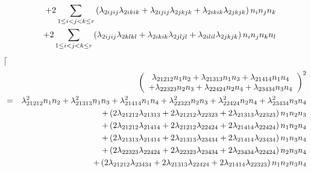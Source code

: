 \documentclass[12pt]{article}
\begin{document}
\begin{itemize}
\begin{eqnarray}
&&+2\sum_{\substack{ 1\leq i<j<k\leq r}}\left( \lambda _{2ijij}\lambda
_{2ikik}+\lambda _{2ijij}\lambda _{2jkjk}+\lambda _{2ikik}\lambda
_{2jkjk}\right) n_{i}n_{j}n_{k}  \notag \\
&&+2\sum_{\substack{ 1\leq i<j<k\leq r}}\left( \lambda _{2ijij}\lambda
_{2klkl}+\lambda _{2ikik}\lambda _{2jljl}+\lambda _{2ilil}\lambda
_{2jkjk}\right) n_{i}n_{j}n_{k}n_{l}
\end{eqnarray}%
$\lceil $%
\begin{eqnarray}
&&\left( 
\begin{array}{c}
\lambda _{21212}n_{1}n_{2}+\lambda _{21313}n_{1}n_{3}+\lambda
_{21414}n_{1}n_{4} \\ 
+\lambda _{22323}n_{2}n_{3}+\lambda _{22424}n_{2}n_{4}+\lambda
_{23434}n_{3}n_{4}%
\end{array}%
\right) ^{2}  \notag \\
&=&\lambda _{21212}^{2}n_{1}n_{2}+\lambda _{21313}^{2}n_{1}n_{3}+\lambda
_{21414}^{2}n_{1}n_{4}+\lambda _{22323}^{2}n_{2}n_{3}+\lambda
_{22424}^{2}n_{2}n_{4}+\lambda _{23434}^{2}n_{3}n_{4}  \notag \\
&&+\left( 2\lambda _{21212}\lambda _{21313}+2\lambda _{21212}\lambda
_{22323}+2\lambda _{21313}\lambda _{22323}\right) n_{1}n_{2}n_{3}  \notag \\
&&+\left( 2\lambda _{21212}\lambda _{21414}+2\lambda _{21212}\lambda
_{22424}+2\lambda _{21414}\lambda _{22424}\right) n_{1}n_{2}n_{4}  \notag \\
&&+\left( 2\lambda _{21313}\lambda _{21414}+2\lambda _{21313}\lambda
_{23434}+2\lambda _{21414}\lambda _{23434}\right) n_{1}n_{3}n_{4}  \notag \\
&&+\left( 2\lambda _{22323}\lambda _{22424}+2\lambda _{22323}\lambda
_{23434}+2\lambda _{23434}\lambda _{22424}\right) n_{2}n_{3}n_{4}  \notag \\
&&+\left( 2\lambda _{21212}\lambda _{23434}+2\lambda _{21313}\lambda
_{22424}+2\lambda _{21414}\lambda _{22323}\right) n_{1}n_{2}n_{3}n_{4}
\end{eqnarray}
\end{itemize}
\end{document}
